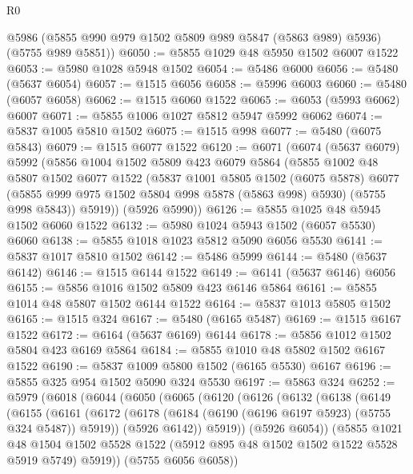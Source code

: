 \begin{lexlean}{R0}
\begin{coremodule}
      @5986
      (@5855 @990 @979 @1502 @5809 @989 @5847 (@5863 @989) @5936)
      (@5755 @989 @5851))
@6050 := @5855 @1029 @48 @5950 @1502 @6007 @1522
@6053 := @5980 @1028 @5948 @1502
@6054 := @5486 @6000
@6056 := @5480 (@5637 @6054)
@6057 := @1515 @6056
@6058 := @5996 @6003
@6060 := @5480 (@6057 @6058)
@6062 := @1515 @6060 @1522
@6065 := @6053 (@5993 @6062) @6007
@6071 := @5855 @1006 @1027 @5812 @5947 @5992 @6062
@6074 := @5837 @1005 @5810 @1502
@6075 := @1515 @998
@6077 := @5480 (@6075 @5843)
@6079 := @1515 @6077 @1522
@6120 := @6071
    (@6074
      (@5637 @6079)
      @5992
      (@5856
        @1004
        @1502
        @5809
        @423
        @6079
        @5864
        (@5855
          @1002
          @48
          @5807
          @1502
          @6077
          @1522
          (@5837
            @1001
            @5805
            @1502
            (@6075 @5878)
            @6077
            (@5855 @999 @975 @1502 @5804 @998 @5878 (@5863 @998) @5930)
            (@5755 @998 @5843))
          @5919))
      (@5926 @5990))
@6126 := @5855 @1025 @48 @5945 @1502 @6060 @1522
@6132 := @5980 @1024 @5943 @1502 (@6057 @5530) @6060
@6138 := @5855 @1018 @1023 @5812 @5090 @6056 @5530
@6141 := @5837 @1017 @5810 @1502
@6142 := @5486 @5999
@6144 := @5480 (@5637 @6142)
@6146 := @1515 @6144 @1522
@6149 := @6141 (@5637 @6146) @6056
@6155 := @5856 @1016 @1502 @5809 @423 @6146 @5864
@6161 := @5855 @1014 @48 @5807 @1502 @6144 @1522
@6164 := @5837 @1013 @5805 @1502
@6165 := @1515 @324
@6167 := @5480 (@6165 @5487)
@6169 := @1515 @6167 @1522
@6172 := @6164 (@5637 @6169) @6144
@6178 := @5856 @1012 @1502 @5804 @423 @6169 @5864
@6184 := @5855 @1010 @48 @5802 @1502 @6167 @1522
@6190 := @5837 @1009 @5800 @1502 (@6165 @5530) @6167
@6196 := @5855 @325 @954 @1502 @5090 @324 @5530
@6197 := @5863 @324
@6252 := @5979
    (@6018
      (@6044
        (@6050
          (@6065
            (@6120
              (@6126
                (@6132
                  (@6138
                    (@6149
                      (@6155
                        (@6161
                          (@6172
                            (@6178 (@6184 (@6190 (@6196 @6197 @5923) (@5755 @324 @5487)) @5919))
                            (@5926 @6142))
                          @5919))
                      (@5926 @6054))
                    (@5855
                      @1021
                      @48
                      @1504
                      @1502
                      @5528
                      @1522
                      (@5912 @895 @48 @1502 @1502 @1522 @5528 @5919 @5749)
                      @5919))
                  (@5755 @6056 @6058))

\end{coremodule}
\end{lexlean}
